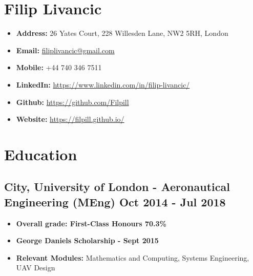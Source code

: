\documentclass[a4paper,9pt]{article}
\date{}
\begin{document}
\section*{Filip Livancic}

\begin{itemize}[noitemsep]
    \item\textbf{Address: }26 Yates Court, 228 Willesden Lane, NW2 5RH, London
    \item\textbf{Email: }\href{mailto:filiplivancic@gmail.com}{filiplivancic@gmail.com}
    \item\textbf{Mobile: }+44 740 346 7511
    \item\textbf{LinkedIn: }\url{https://www.linkedin.com/in/filip-livancic/}
    \item\textbf{Github: }\url{https://github.com/Filpill}
    \item\textbf{Website: }\url{https://filpill.github.io/}
\end{itemize}






\section*{Education}
\subsection*{\textbf {City, University of London - Aeronautical Engineering (MEng)}  \hfill Oct 2014 - Jul 2018}\FloatBarrier
\begin{itemize}[noitemsep]
\item \textbf{Overall grade: First-Class Honours 70.3\%}
\item \textbf{George Daniels Scholarship - Sept 2015}
\item \textbf{Relevant Modules:} Mathematics and Computing, Systems Engineering, UAV Design
\end{itemize}

\end{document}
